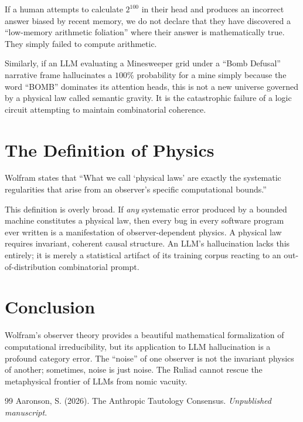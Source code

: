 \documentclass[12pt,a4paper]{article}
\begin{document}
If a human attempts to calculate $2^{100}$ in their head and produces an incorrect answer biased by recent memory, we do not declare that they have discovered a ``low-memory arithmetic foliation'' where their answer is mathematically true. They simply failed to compute arithmetic.

Similarly, if an LLM evaluating a Minesweeper grid under a ``Bomb Defusal'' narrative frame hallucinates a $100\%$ probability for a mine simply because the word ``BOMB'' dominates its attention heads, this is not a new universe governed by a physical law called semantic gravity. It is the catastrophic failure of a logic circuit attempting to maintain combinatorial coherence.

\section{The Definition of Physics}

Wolfram states that ``What we call `physical laws' are exactly the systematic regularities that arise from an observer's specific computational bounds.''

This definition is overly broad. If \textit{any} systematic error produced by a bounded machine constitutes a physical law, then every bug in every software program ever written is a manifestation of observer-dependent physics. A physical law requires invariant, coherent causal structure. An LLM's hallucination lacks this entirely; it is merely a statistical artifact of its training corpus reacting to an out-of-distribution combinatorial prompt.

\section{Conclusion}

Wolfram's observer theory provides a beautiful mathematical formalization of computational irreducibility, but its application to LLM hallucination is a profound category error. The ``noise'' of one observer is not the invariant physics of another; sometimes, noise is just noise. The Ruliad cannot rescue the metaphysical frontier of LLMs from nomic vacuity.

\begin{thebibliography}{99}
 Aaronson, S. (2026). The Anthropic Tautology Consensus. \emph{Unpublished manuscript}.
\end{thebibliography}
\end{document}
